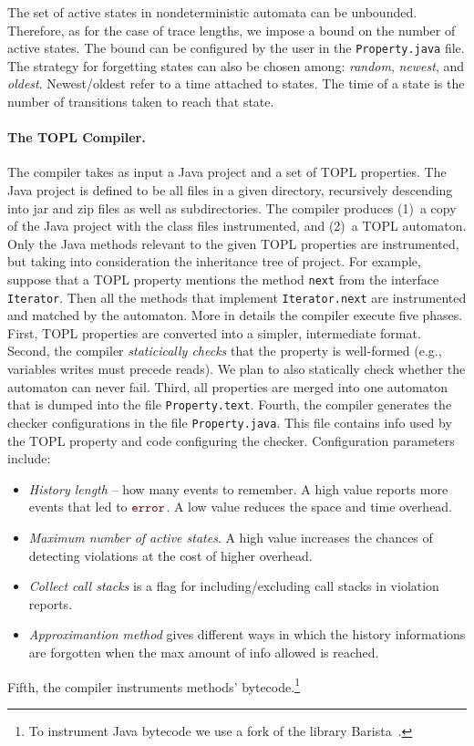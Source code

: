 \documentclass{article} %
\newcommand{\error}{\ensuremath{\textcolor{darkred}{\mathtt{error}}}\xspace}
\theoremstyle{definition}
\theoremstyle{remark}
\begin{document}
The set of active states in nondeterministic automata can be unbounded.
Therefore, as for the case of trace lengths, we impose a bound on the number of active states. 
The bound can be configured by the user  in the {\tt Property.java}  file.  
The  strategy for forgetting states can also be chosen among: {\em random}, {\em newest}, and {\em oldest}.
Newest\slash oldest refer to a time attached to states.
The time  of a state is the number of transitions  taken to reach that state.

\paragraph{The TOPL Compiler.} \label{sec:toplc} %
The compiler takes as input a Java project and a set of TOPL properties.
The Java project is defined to be all files in a given directory, recursively descending into jar and zip files as well as  subdirectories.
The compiler produces (1)~a copy of the Java project with the class files instrumented, and (2)~a TOPL automaton.
Only the Java methods relevant to the given TOPL properties are instrumented, but taking into consideration 
 the inheritance tree of  project.
For example, suppose that a TOPL property mentions the method {\tt next} from the interface {\tt Iterator}.
Then all the methods that implement {\tt Iterator.next} are instrumented and  matched by the automaton.
%
More in details the compiler execute  five phases.
First, TOPL properties are converted into a simpler, intermediate format. 
Second, the compiler  {\em staticically checks}  that the property is well-formed (e.g., variables writes must precede reads). We plan to also statically check whether the automaton can never fail.
%
Third,  all properties are merged into one automaton that is  dumped into the file {\tt Property.text}.
%
Fourth, the compiler generates the checker configurations in 
the file {\tt Property.java}. This file contains 
info used by the TOPL property and code configuring the checker.
Configuration parameters include:
\begin{itemize}
\item \emph{History length} -- how many events to remember.
  A high value reports more events that led to \error.
  A low value reduces the space and time overhead.
\item \emph{Maximum number of active states}.
  A high value increases the chances of detecting violations at the cost of higher  overhead.

\item \emph{Collect call stacks} is a flag for including/excluding  call stacks in violation reports.
%
\item {\em Approximantion method} gives different ways in which the history informations are forgotten when  the max amount of info 
allowed is reached.
\end{itemize}
%
Fifth, the compiler instruments methods' bytecode.\footnote{To instrument Java bytecode we use a fork of the library 
Barista~\cite{barista}.}
\end{document}
